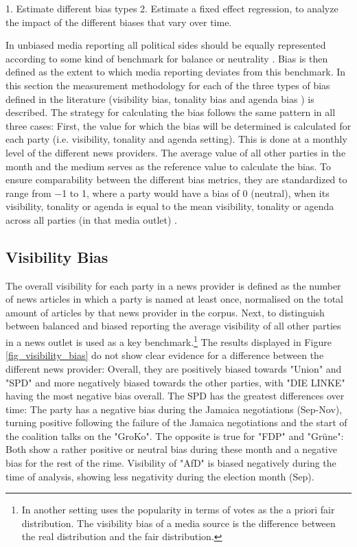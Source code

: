 \documentclass[12pt,a4paper,notitlepage]{article}
\begin{document}
1. Estimate different bias types 
2. Estimate a fixed effect regression, to analyze the impact of the different biases that vary over time.

In unbiased media reporting all political sides should be equally represented according to some kind of benchmark for balance or neutrality \citep{hopmann_political_2012}. Bias is then defined as the extent to which media reporting deviates from this benchmark. In this section the measurement methodology for each of the three types of bias defined in the literature (visibility bias, tonality bias and agenda bias \citet{junque_de_fortuny_media_2012, eberl_one_2017}) is described. The strategy for calculating the bias follows the same pattern in all three cases: First, the value for which the bias will be determined is calculated for each party (i.e. visibility, tonality and agenda setting). This is done at a monthly level of the different news providers. The average value of all other parties in the month and the medium serves as the reference value to calculate the bias. To ensure comparability between the different bias metrics, they are standardized to range from −1 to 1, where a party would have a bias of 0 (neutral), when its visibility, tonality or agenda is equal to the mean visibility, tonality or agenda across all parties (in that media outlet) \citep{eberl_one_2017}.

\subsection{Visibility Bias}
 
The overall visibility for each party in a news provider is defined as the number of news articles in which a party is named at least once, normalised on the total amount of articles by that news provider in the corpus. Next, to distinguish between balanced and biased reporting the average visibility of all other parties in a news outlet is used as a key benchmark.\footnote{In another setting \citet{junque_de_fortuny_media_2012} uses the popularity in terms of votes as the a priori fair distribution. The visibility bias of a media source is the difference between the real distribution and the fair distribution.} The results displayed in Figure \ref{fig_visibility_bias} do not show clear evidence for a difference between the different news provider: Overall, they are positively biased towards "Union" and "SPD" and more negatively biased towards the other parties, with "DIE LINKE" having the most negative bias overall. The SPD has the greatest differences over time: The party has a negative bias during the Jamaica negotiations (Sep-Nov), turning positive following the failure of the Jamaica negotiations and the start of the coalition talks on the "GroKo". The opposite is true for "FDP" and "Grüne": Both show a rather positive or neutral bias during these month and a negative bias for the rest of the rime. Visibility of "AfD" is biased negatively during the time of analysis, showing less negativity during the election month (Sep).
\end{document}
